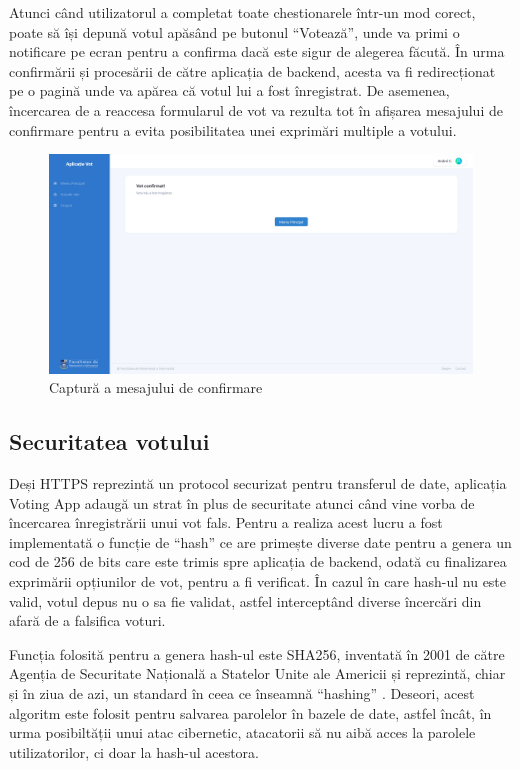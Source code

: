 Atunci când utilizatorul a completat toate chestionarele într-un mod corect, poate să își depună votul apăsând pe butonul \enquote{Votează}, unde va primi o notificare pe ecran pentru a confirma dacă este sigur de alegerea făcută. În urma confirmării și procesării de către aplicația de backend, acesta va fi redirecționat pe o pagină unde va apărea că votul lui a fost înregistrat. De asemenea, încercarea de a reaccesa formularul de vot va rezulta tot în afișarea mesajului de confirmare pentru a evita posibilitatea unei exprimări multiple a votului.

\begin{figure}[!ht]
    \centering
    \includegraphics[width=145mm]{images/vote_confirmed.png}
    \caption{Captură a mesajului de confirmare}
\end{figure}

\subsection{Securitatea votului}

Deși HTTPS reprezintă un protocol securizat pentru transferul de date, aplicația Voting App adaugă un strat în plus de securitate atunci când vine vorba de încercarea înregistrării unui vot fals. Pentru a realiza acest lucru a fost implementată o funcție de \enquote{hash} ce are primește diverse date pentru a genera un cod de 256 de bits care este trimis spre aplicația de backend, odată cu finalizarea exprimării opțiunilor de vot, pentru a fi verificat. În cazul în care hash-ul nu este valid, votul depus nu o sa fie validat, astfel interceptând diverse încercări din afară de a falsifica voturi.

Funcția folosită pentru a genera hash-ul este SHA256, inventată în 2001 de către Agenția de Securitate Națională a Statelor Unite ale Americii și reprezintă, chiar și în ziua de azi, un standard în ceea ce înseamnă \enquote{hashing} \cite{what_is_hashing}. Deseori, acest algoritm este folosit pentru salvarea parolelor în bazele de date, astfel încât, în urma posibiltății unui atac cibernetic, atacatorii să nu aibă acces la parolele utilizatorilor, ci doar la hash-ul acestora.

